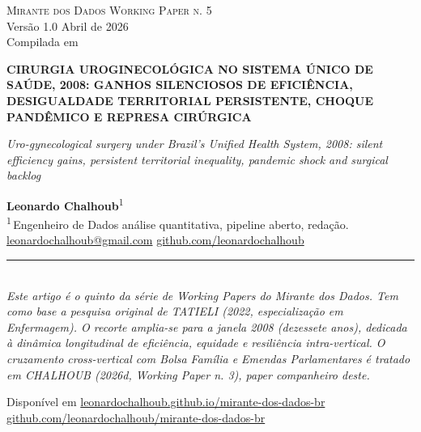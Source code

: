 \documentclass[12pt,a4paper,oneside]{article}
\begin{document}
\begin{titlepage}
  \begin{center}
    \vspace*{1.5cm}
    {\small\textsc{Mirante dos Dados \quad\textbar\quad Working Paper n. 5}}\\
    {\small Versão 1.0 \textemdash{} Abril de 2026}\\[2pt]
    {\footnotesize Compilada em \COMPILESTAMP\ \textbullet\ \texttt{\COMPILESHA}}

    \vfill

    {\LARGE\bfseries
     CIRURGIA UROGINECOLÓGICA NO SISTEMA
     ÚNICO DE SAÚDE, 2008:
     GANHOS SILENCIOSOS DE EFICIÊNCIA,
     DESIGUALDADE TERRITORIAL PERSISTENTE,
     CHOQUE PANDÊMICO E REPRESA CIRÚRGICA}

    \vspace{1cm}
    {\large\itshape
     Uro-gynecological surgery under Brazil's Unified Health System,
     2008: silent efficiency gains, persistent
     territorial inequality, pandemic shock and surgical backlog}

    \vfill

    {\large\textbf{Leonardo Chalhoub}\textsuperscript{1}}\\[6pt]
    {\small\textsuperscript{1}\,Engenheiro de Dados \textemdash{}
     análise quantitativa, pipeline aberto, redação.}\\[6pt]
    {\small\href{mailto:leonardochalhoub@gmail.com}{leonardochalhoub@gmail.com}
     \quad\textbullet\quad
     \href{https://github.com/leonardochalhoub}{github.com/leonardochalhoub}}

    \vfill

    \rule{0.6\linewidth}{0.4pt}\\[6pt]
    {\small\textit{Este artigo é o quinto da série de Working Papers
     do Mirante dos Dados. Tem como base a pesquisa original de
     TATIELI (2022, especialização em Enfermagem). O recorte
     amplia-se para a janela 2008 (dezessete anos),
     dedicada à dinâmica longitudinal de eficiência, equidade e
     resiliência \textit{intra-vertical}. O cruzamento
     \textit{cross-vertical} com Bolsa Família e Emendas
     Parlamentares é tratado em CHALHOUB (2026d, Working Paper n. 3),
     paper companheiro deste.}}

    \vspace{1cm}
    {\footnotesize
     Disponível em
     \href{https://leonardochalhoub.github.io/mirante-dos-dados-br/}%
     {leonardochalhoub.github.io/mirante-dos-dados-br}}\\[2pt]
    {\footnotesize
     \href{https://github.com/leonardochalhoub/mirante-dos-dados-br}%
     {github.com/leonardochalhoub/mirante-dos-dados-br}}
  \end{center}
\end{titlepage}
\end{document}
